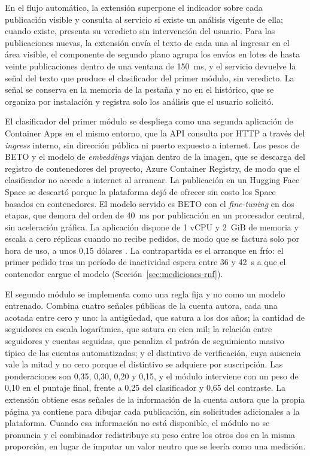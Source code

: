 En el flujo automático, la extensión superpone el indicador sobre cada publicación visible y consulta al servicio si existe un análisis vigente de ella; cuando existe, presenta su veredicto sin intervención del usuario. Para las publicaciones nuevas, la extensión envía el texto de cada una al ingresar en el área visible, el componente de segundo plano agrupa los envíos en lotes de hasta veinte publicaciones dentro de una ventana de 150~ms, y el servicio devuelve la señal del texto que produce el clasificador del primer módulo, sin veredicto. La señal se conserva en la memoria de la pestaña y no en el histórico, que se organiza por instalación y registra solo los análisis que el usuario solicitó.

El clasificador del primer módulo se despliega como una segunda aplicación de Container Apps en el mismo entorno, que la API consulta por HTTP a través del \textit{ingress} interno, sin dirección pública ni puerto expuesto a internet. Los pesos de BETO y el modelo de \textit{embeddings} viajan dentro de la imagen, que se descarga del registro de contenedores del proyecto, Azure Container Registry, de modo que el clasificador no accede a internet al arrancar. La publicación en un Hugging Face Space se descartó porque la plataforma dejó de ofrecer sin costo los Space basados en contenedores. El modelo servido es BETO con el \textit{fine-tuning} en dos etapas, que demora del orden de 40~ms por publicación en un procesador central, sin aceleración gráfica. La aplicación dispone de 1 vCPU y 2~GiB de memoria y escala a cero réplicas cuando no recibe pedidos, de modo que se factura solo por hora de uso, a unos 0,15 dólares \parencite{MicrosoftAzureContainerApps2026}. La contrapartida es el arranque en frío: el primer pedido tras un período de inactividad espera entre 36 y 42~s a que el contenedor cargue el modelo (Sección~\ref{sec:mediciones-rnf}).

El segundo módulo se implementa como una regla fija y no como un modelo entrenado. Combina cuatro señales públicas de la cuenta autora, cada una acotada entre cero y uno: la antigüedad, que satura a los dos años; la cantidad de seguidores en escala logarítmica, que satura en cien mil; la relación entre seguidores y cuentas seguidas, que penaliza el patrón de seguimiento masivo típico de las cuentas automatizadas; y el distintivo de verificación, cuya ausencia vale la mitad y no cero porque el distintivo se adquiere por suscripción. Las ponderaciones son 0,35, 0,30, 0,20 y 0,15, y el módulo interviene con un peso de 0,10 en el puntaje final, frente a 0,25 del clasificador y 0,65 del contraste. La extensión obtiene esas señales de la información de la cuenta autora que la propia página ya contiene para dibujar cada publicación, sin solicitudes adicionales a la plataforma. Cuando esa información no está disponible, el módulo no se pronuncia y el combinador redistribuye su peso entre los otros dos en la misma proporción, en lugar de imputar un valor neutro que se leería como una medición.

